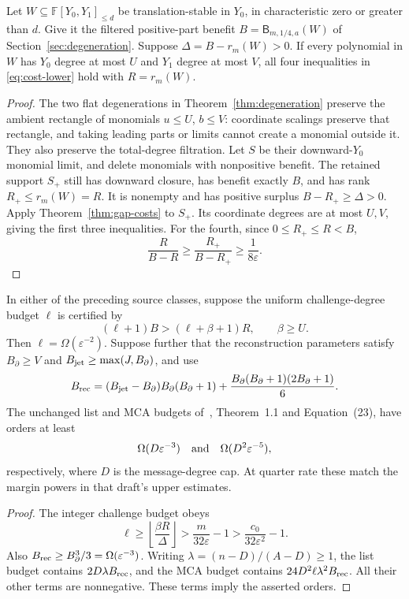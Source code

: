 \begin{corollary}
Let $W\subseteq\mathbb F[Y_0,Y_1]_{\le d}$ be translation-stable in
$Y_0$, in characteristic zero or greater than $d$. Give it the filtered
positive-part benefit $B=\mathsf B_{m,1/4,a}(W)$ of
Section~\ref{sec:degeneration}. Suppose $\Delta=B-r_m(W)>0$.
If every polynomial in $W$ has $Y_0$ degree at most $U$ and $Y_1$
degree at most $V$, all four inequalities in \eqref{eq:cost-lower}
hold with $R=r_m(W)$.
\end{corollary}
\begin{proof}
The two flat degenerations in Theorem~\ref{thm:degeneration} preserve
the ambient rectangle of monomials $u\le U$, $b\le V$: coordinate
scalings preserve that rectangle, and taking leading parts or limits
cannot create a monomial outside it. They also preserve the total-degree
filtration. Let $S$ be their downward-$Y_0$ monomial limit, and delete
monomials with nonpositive benefit. The retained support $S_+$ still
has downward closure, has benefit exactly $B$, and has rank
$R_+\le r_m(W)=R$. It is nonempty and has positive surplus
$B-R_+\ge\Delta>0$. Apply Theorem~\ref{thm:gap-costs} to $S_+$.
Its coordinate degrees are at most $U,V$, giving the first three
inequalities. For the fourth, since $0\le R_+\le R<B$,
\[
 \frac{R}{B-R}\ge\frac{R_+}{B-R_+}\ge\frac1{8\varepsilon}.
\]
\end{proof}

\begin{corollary}
In either of the preceding source classes, suppose the uniform challenge-degree budget $\ell$ is certified by
\[
 (\ell+1)B>(\ell+\beta+1)R,\qquad \beta\ge U.
\]
Then $\ell=\Omega(\varepsilon^{-2})$. Suppose further that the
reconstruction parameters satisfy
$B_{\partial}\ge V$ and $B_{\rm jet}\ge\max(J,B_{\partial})$, and use
\[
 B_{\rm rec}=(B_{\rm jet}-B_{\partial})B_{\partial}(B_{\partial}+1)
  +\frac{B_{\partial}(B_{\partial}+1)(2B_{\partial}+1)}6.
\]
The unchanged list and MCA budgets of~\cite{DKT}, Theorem~1.1 and
Equation~(23), have orders at least
\[
 \Omega(D\varepsilon^{-3})\quad\hbox{and}\quad
 \Omega(D^2\varepsilon^{-5}),
\]
respectively, where $D$ is the message-degree cap. At quarter rate these
match the margin powers in that draft's upper estimates.
\end{corollary}
\begin{proof}
The integer challenge budget obeys
\[
 \ell\ge\left\lfloor\frac{\beta R}{\Delta}\right\rfloor
 >\frac{m}{32\varepsilon}-1
 >\frac{c_0}{32\varepsilon^2}-1.
\]
Also $B_{\rm rec}\ge B_{\partial}^3/3=\Omega(\varepsilon^{-3})$.
Writing $\lambda=(n-D)/(A-D)\ge1$, the list budget contains
$2D\lambda B_{\rm rec}$, and the MCA budget contains
$24D^2\ell\lambda^2B_{\rm rec}$. All their other terms are nonnegative.
These terms imply the asserted orders.
\end{proof}

